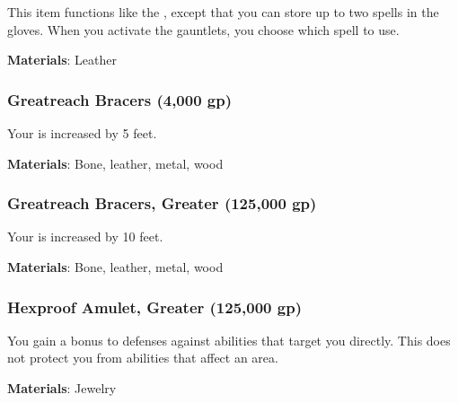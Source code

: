 This item functions like the , except that you can store up to two spells in the gloves.
When you activate the gauntlets, you choose which spell to use.



\vspace{0.25em}
\textbf{Materials}: Leather


\lowercase{\hypertarget{item:Greatreach Bracers}{}}\label{item:Greatreach Bracers}
\hypertarget{item:Greatreach Bracers}{\subsubsection{Greatreach Bracers\hfill{} (4,000 gp)}}

Your  is increased by 5 feet.



\vspace{0.25em}
\textbf{Materials}: Bone, leather, metal, wood


\lowercase{\hypertarget{item:Greatreach Bracers, Greater}{}}\label{item:Greatreach Bracers, Greater}
\hypertarget{item:Greatreach Bracers, Greater}{\subsubsection{Greatreach Bracers, Greater\hfill{} (125,000 gp)}}

Your  is increased by 10 feet.



\vspace{0.25em}
\textbf{Materials}: Bone, leather, metal, wood


\lowercase{\hypertarget{item:Hexproof Amulet, Greater}{}}\label{item:Hexproof Amulet, Greater}
\hypertarget{item:Hexproof Amulet, Greater}{\subsubsection{Hexproof Amulet, Greater\hfill{} (125,000 gp)}}

You gain a  bonus to defenses against  abilities that target you directly.
This does not protect you from abilities that affect an area.



\vspace{0.25em}
\textbf{Materials}: Jewelry


